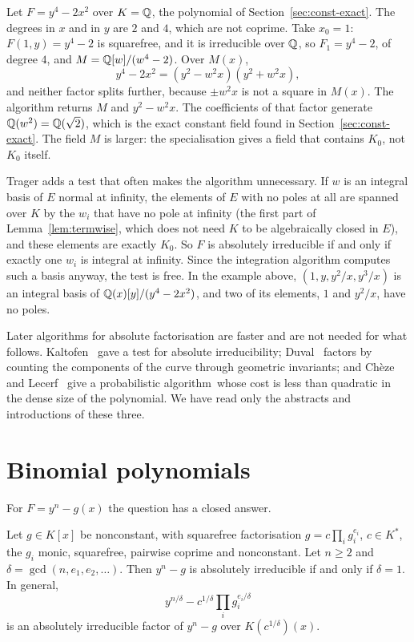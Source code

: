 \begin{example}\label{ex:absolute-factor}
Let $F = y^4 - 2x^2$ over $K = \mathbb{Q}$, the polynomial of
Section~\ref{sec:const-exact}. The degrees in $x$ and in $y$ are $2$ and $4$,
which are not coprime. Take $x_0 = 1$: $F(1, y) = y^4 - 2$ is squarefree, and
it is irreducible over $\mathbb{Q}$, so $F_1 = y^4 - 2$, of degree $4$, and $M =
\mathbb{Q}[w]/(w^4 - 2)$. Over $M(x)$,
\[
  y^4 - 2x^2 = (y^2 - w^2 x)(y^2 + w^2 x) ,
\]
and neither factor splits further, because $\pm w^2 x$ is not a square in
$M(x)$. The algorithm returns $M$ and $y^2 - w^2 x$. The coefficients of
that factor generate $\mathbb{Q}(w^2) = \mathbb{Q}(\sqrt2)$, which is the exact constant
field found in Section~\ref{sec:const-exact}. The field $M$ is larger: the
specialisation gives a field that contains $K_0$, not $K_0$ itself.
\end{example}

Trager adds a test that often makes the algorithm unnecessary. If $w$ is an
integral basis of $E$ normal at infinity, the elements of $E$ with no poles
at all are spanned over $K$ by the $w_i$ that have no pole at infinity
(the first part of Lemma~\ref{lem:termwise}, which does not need $K$ to be
algebraically closed in $E$), and these elements are exactly $K_0$. So $F$ is
absolutely irreducible if and only if exactly one $w_i$ is integral at
infinity. Since the integration algorithm computes such a basis anyway, the
test is free. In the example above, $(1, y, y^2/x, y^3/x)$ is an integral
basis of $\mathbb{Q}(x)[y]/(y^4 - 2x^2)$, and two of its elements, $1$ and $y^2/x$,
have no poles.

Later algorithms for absolute factorisation are faster and are not needed
for what follows. Kaltofen~\cite{kaltofen1985} gave a test for absolute
irreducibility; Duval~\cite{duval1991} factors by counting the components of
the curve through geometric invariants; and Ch\`eze and
Lecerf~\cite{cheze2007} give a probabilistic algorithm\later\ whose cost is
less than quadratic in the dense size of the polynomial. We have read only
the abstracts and introductions of these three.

\section{Binomial polynomials}\label{sec:const-binomial}

For $F = y^n - g(x)$ the question has a closed answer.

\begin{theorem}\label{thm:binomial}
Let $g \in K[x]$ be nonconstant, with squarefree factorisation $g = c
\prod_i g_i^{e_i}$, $c \in K^*$, the $g_i$ monic, squarefree, pairwise coprime
and nonconstant. Let $n \ge 2$ and $\delta = \gcd(n, e_1, e_2, \dots)$. Then
$y^n - g$ is absolutely irreducible if and only if $\delta = 1$. In general,
\[
  y^{n/\delta} - c^{1/\delta} \prod_i g_i^{e_i/\delta}
\]
is an absolutely irreducible factor of $y^n - g$ over $K(c^{1/\delta})(x)$.
\end{theorem}

